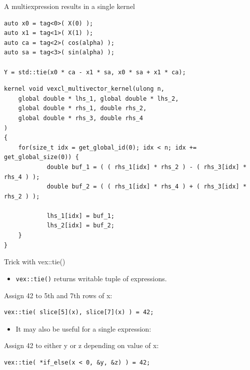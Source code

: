 \documentclass[@BEAMER_OPTIONS@]{beamer}
\newcommand{\code}[1]{\lstinline|#1|}
\begin{document}
\begin{frame}[fragile,shrink=5]{A multiexpression results in a single kernel}
    \begin{exampleblock}{}
        \begin{lstlisting}
auto x0 = tag<0>( X(0) );
auto x1 = tag<1>( X(1) );
auto ca = tag<2>( cos(alpha) );
auto sa = tag<3>( sin(alpha) );

Y = std::tie(x0 * ca - x1 * sa, x0 * sa + x1 * ca);
        \end{lstlisting}
    \end{exampleblock}
    \begin{exampleblock}{}
        \begin{lstlisting}
kernel void vexcl_multivector_kernel(ulong n,
    global double * lhs_1, global double * lhs_2,
    global double * rhs_1, double rhs_2,
    global double * rhs_3, double rhs_4
)
{
    for(size_t idx = get_global_id(0); idx < n; idx += get_global_size(0)) {
            double buf_1 = ( ( rhs_1[idx] * rhs_2 ) - ( rhs_3[idx] * rhs_4 ) );
            double buf_2 = ( ( rhs_1[idx] * rhs_4 ) + ( rhs_3[idx] * rhs_2 ) );

            lhs_1[idx] = buf_1;
            lhs_2[idx] = buf_2;
    }
}

        \end{lstlisting}
    \end{exampleblock}
\end{frame}

\note{ }

\begin{frame}[fragile]{Trick with vex::tie()}
    \begin{itemize}
        \item \code{vex::tie()} returns writable tuple of expressions.
    \end{itemize}
    \begin{exampleblock}{Assign 42 to 5th and 7th rows of x:}
        \begin{lstlisting}
vex::tie( slice[5](x), slice[7](x) ) = 42;
        \end{lstlisting}
    \end{exampleblock}
    \begin{itemize}
        \item It may also be useful for a single expression:
    \end{itemize}
    \begin{exampleblock}{Assign 42 to either y or z depending on value of x:}
        \begin{lstlisting}
vex::tie( *if_else(x < 0, &y, &z) ) = 42;
        \end{lstlisting}
    \end{exampleblock}
\end{frame}
\end{document}
